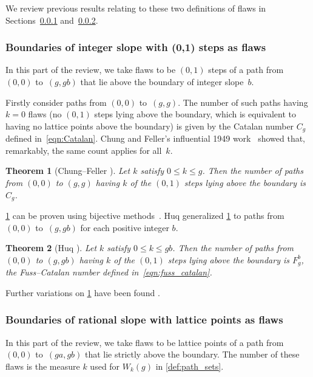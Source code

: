 \documentclass[11pt]{article}
\newtheorem{thm}{Theorem}[section] %
\theoremstyle{definition} %
\numberwithin{equation}{section}
\begin{document}
We review previous results relating to these two definitions of flaws in Sections~\ref{sec:first_setting} and~\ref{sec:second_setting}.


\subsubsection{Boundaries of integer slope with (0,1) steps as flaws}
\label{sec:first_setting}

In this part of the review, we take flaws to be $(0,1)$ steps of a path from $(0,0)$ to~$(g,gb)$ that lie above the boundary of integer slope~$b$.

Firstly consider paths from $(0,0)$ to~$(g,g)$. The number of such paths having $k=0$ flaws (no $(0,1)$ steps lying above the boundary, which is equivalent to having no lattice points above the boundary) is given by the Catalan number $C_g$ defined in~\eqref{eqn:Catalan}.
Chung and Feller's influential 1949 work~\cite{CF} showed that, remarkably, the same count applies for all~$k$.

\begin{thm}[Chung--Feller {\cite[Theorem 2A]{CF}}]\label{thm:CF}
    Let $k$ satisfy $0 \le k \le g$. Then the number of paths from $(0,0)$ to $(g,g)$ having $k$ of the $(0,1)$ steps lying above the boundary is~$C_g$.
\end{thm}

\cref{thm:CF} can be proven using bijective methods~\cite{callan1995pair}. 
Huq generalized \cref{thm:CF} to paths from $(0,0)$ to~$(g,gb)$ for each positive integer $b$.

\begin{thm}[Huq {\cite[Corollary 5.1.2]{huq}}]\label{thm:huq}
    Let $k$ satisfy $0 \le k \le gb$. Then the number of paths from $(0,0)$ to $(g,gb)$ having $k$ of the $(0,1)$ steps lying above the boundary is
    $F_g^b$, the Fuss--Catalan number 
defined in~\eqref{eqn:fuss_catalan}.
\end{thm}

Further variations on \cref{thm:CF} have been found \cite{CF_cyc_shift_bdy, CF_gen,tirrell}.


\subsubsection{Boundaries of rational slope with lattice points as flaws}
\label{sec:second_setting}

In this part of the review, we take flaws to be lattice points of a path from $(0,0)$ to~$(ga,gb)$ that lie strictly above the boundary. The number of these flaws is the measure $k$ used for $W_k(g)$ in \cref{def:path_sets}.
\end{document}
